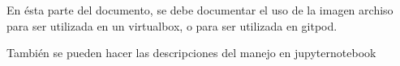 En ésta parte del documento, se debe documentar el uso de la imagen
archiso para ser utilizada en un virtualbox, o para ser utilizada
en gitpod.

También se pueden hacer las descripciones del manejo en jupyternotebook